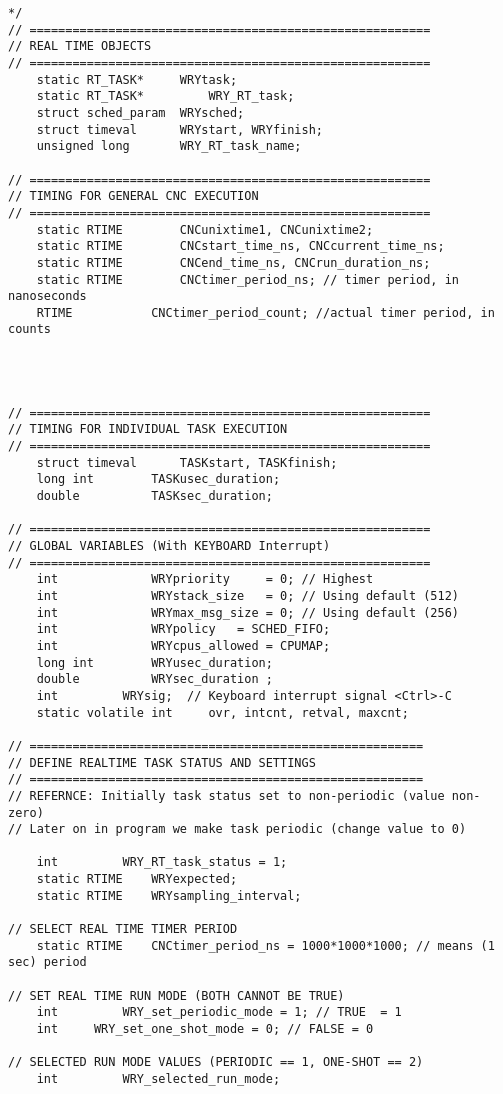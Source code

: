 \begin{lstlisting}[caption={App4-Full C-Code listing for Real Time (RTAI)}, label=App4-Full C-Code listing for Real Time (RTAI)]
*/
// ========================================================
// REAL TIME OBJECTS
// ========================================================
	static RT_TASK* 	WRYtask;
	static RT_TASK*     	WRY_RT_task;
	struct sched_param 	WRYsched;
	struct timeval 		WRYstart, WRYfinish;
	unsigned long 		WRY_RT_task_name; 

// ========================================================
// TIMING FOR GENERAL CNC EXECUTION
// ========================================================
	static RTIME 		CNCunixtime1, CNCunixtime2;
	static RTIME		CNCstart_time_ns, CNCcurrent_time_ns;
	static RTIME		CNCend_time_ns, CNCrun_duration_ns;
	static RTIME 		CNCtimer_period_ns; // timer period, in nanoseconds
	RTIME 			CNCtimer_period_count; //actual timer period, in counts




// ========================================================
// TIMING FOR INDIVIDUAL TASK EXECUTION
// ========================================================
	struct timeval 		TASKstart, TASKfinish;
	long int		TASKusec_duration;
	double			TASKsec_duration;

// ========================================================
// GLOBAL VARIABLES (With KEYBOARD Interrupt)
// ========================================================
	int 			WRYpriority     = 0; // Highest
	int 			WRYstack_size   = 0; // Using default (512)
	int 			WRYmax_msg_size = 0; // Using default (256)
	int 			WRYpolicy 	= SCHED_FIFO;
	int 			WRYcpus_allowed	= CPUMAP;
	long int 		WRYusec_duration;
	double 			WRYsec_duration ;
	int			WRYsig;  // Keyboard interrupt signal <Ctrl>-C
	static volatile int 	ovr, intcnt, retval, maxcnt;

// =======================================================
// DEFINE REALTIME TASK STATUS AND SETTINGS
// =======================================================
// REFERNCE: Initially task status set to non-periodic (value non-zero)
// Later on in program we make task periodic (change value to 0)

	int 		WRY_RT_task_status = 1;  
	static RTIME 	WRYexpected;
	static RTIME 	WRYsampling_interval;	

// SELECT REAL TIME TIMER PERIOD
	static RTIME 	CNCtimer_period_ns = 1000*1000*1000; // means (1 sec) period

// SET REAL TIME RUN MODE (BOTH CANNOT BE TRUE)
	int 		WRY_set_periodic_mode = 1; // TRUE  = 1 
	int		WRY_set_one_shot_mode = 0; // FALSE = 0

// SELECTED RUN MODE VALUES (PERIODIC == 1, ONE-SHOT == 2)
	int 		WRY_selected_run_mode; 


\end{lstlisting}
